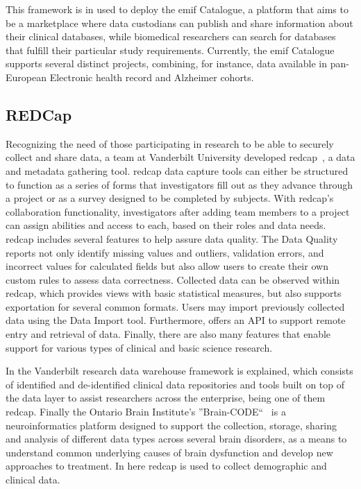 This framework is in used to deploy the \gls{emif} Catalogue, a platform that aims to
be a marketplace where data custodians can publish and share information about their
clinical databases, while biomedical researchers can search for databases that fulfill
their particular study requirements.
Currently, the \gls{emif} Catalogue supports several distinct projects, combining, for
instance, data available in pan-European Electronic health record and Alzheimer
cohorts.

\subsection*{REDCap}
Recognizing the need of those participating in research to be able to securely collect
and share data, a team at Vanderbilt University developed \gls{redcap}~\cite{redcap}, a data and
metadata gathering tool.
\gls{redcap} data capture tools can either be structured to function as a series of
forms that investigators fill out as they advance through a project or as a survey
designed to be completed by subjects.
With \gls{redcap}'s collaboration functionality, investigators after adding team
members to a project can assign abilities and access to each, based on their roles and
data needs.
\gls{redcap} includes several features to help assure data quality.
The Data Quality reports not only identify missing values and outliers, validation
errors, and incorrect values for calculated fields but also allow users to create their
own custom rules to assess data correctness.
Collected data can be observed within \gls{redcap}, which provides views with basic
statistical measures, but also supports exportation for several common formats.
Users may import previously collected data using the Data Import tool.
Furthermore, offers an API to support remote entry and retrieval of data.
Finally, there are also many features that enable support for various types of clinical and
basic science research.

In \cite{vanderbilt} the Vanderbilt research data warehouse framework is explained,
which consists of identified and de-identified clinical data repositories and tools
built on top of the data layer to assist researchers across the enterprise, being one
of them \gls{redcap}.
Finally the Ontario Brain Institute’s ''Brain-CODE``~\cite{braincode} is a
neuroinformatics platform designed to support the collection, storage, sharing and
analysis of different data types across several brain disorders, as a means to
understand common underlying causes of brain dysfunction and develop new approaches to
treatment.
In here \gls{redcap} is used to collect demographic and clinical data.

